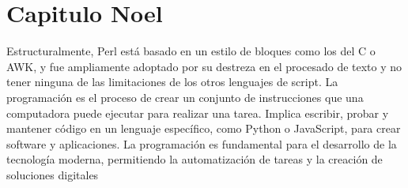 \section{Capitulo Noel}    
Estructuralmente, Perl está basado en un estilo de bloques como los del C o AWK, y fue ampliamente adoptado por su destreza en el procesado de texto y no tener ninguna de las limitaciones de los otros lenguajes de script. La programación es el proceso de crear un conjunto de instrucciones que una computadora puede ejecutar para realizar una tarea. Implica escribir, probar y mantener código en un lenguaje específico, como Python o JavaScript, para crear software y aplicaciones. La programación es fundamental para el desarrollo de la tecnología moderna, permitiendo la automatización de tareas y la creación de soluciones digitales